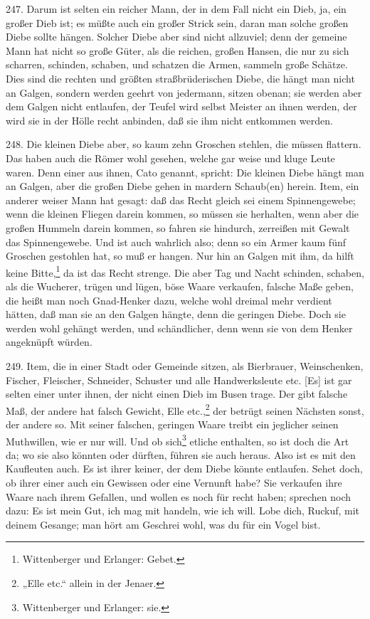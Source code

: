 247. Darum ist selten ein reicher Mann, der in dem Fall nicht ein Dieb, ja, ein großer Dieb ist; es müßte auch ein großer Strick sein, daran man solche großen Diebe sollte hängen. Solcher Diebe aber sind nicht allzuviel; denn der gemeine Mann hat nicht so große Güter, als die reichen, großen Hansen, die nur zu sich scharren, schinden, schaben, und schatzen die Armen, sammeln große Schätze. Dies sind die rechten und größten straßbrüderischen Diebe, die hängt man nicht an Galgen, sondern werden geehrt von jedermann, sitzen obenan; sie werden aber dem Galgen nicht entlaufen, der Teufel wird selbst Meister an ihnen werden, der wird sie in der Hölle recht anbinden, daß sie ihm nicht entkommen werden.

248. Die kleinen Diebe aber, so kaum zehn Groschen stehlen, die müssen flattern. Das haben auch die Römer wohl gesehen, welche gar weise und kluge Leute waren. Denn einer aus ihnen, Cato genannt, spricht: Die kleinen Diebe hängt man an Galgen, aber die großen Diebe gehen in mardern Schaub(en) herein. Item, ein anderer weiser Mann hat gesagt: daß das Recht gleich sei einem Spinnengewebe; wenn die kleinen Fliegen darein kommen, so müssen sie herhalten, wenn aber die großen Hummeln darein kommen, so fahren sie hindurch, zerreißen mit Gewalt das Spinnengewebe. Und ist auch wahrlich also; denn so ein Armer kaum fünf Groschen gestohlen hat, so muß er hangen. Nur hin an Galgen mit ihm, da hilft keine Bitte,\footnote{Wittenberger und Erlanger: Gebet.} da ist das Recht strenge. Die aber Tag und Nacht schinden, schaben, als die Wucherer, trügen und lügen, böse Waare verkaufen, falsche Maße geben, die heißt man noch Gnad-Henker dazu, welche wohl dreimal mehr verdient hätten, daß man sie an den Galgen hängte, denn die geringen Diebe. Doch sie werden wohl gehängt werden, und schändlicher, denn wenn sie von dem Henker angeknüpft würden.

249. Item, die in einer Stadt oder Gemeinde sitzen, als Bierbrauer, Weinschenken, Fischer, Fleischer, Schneider, Schuster und alle Handwerksleute etc. [Es] ist gar selten einer unter ihnen, der nicht einen Dieb im Busen trage. Der gibt falsche Maß, der andere hat falsch Gewicht, Elle etc.,\footnote{„Elle etc.“ allein in der Jenaer.} der betrügt seinen Nächsten sonst, der andere so. Mit seiner falschen, geringen Waare treibt ein jeglicher seinen Muthwillen, wie er nur will. Und ob sich\footnote{Wittenberger und Erlanger: sie.} etliche enthalten, so ist doch die Art da; wo sie also könnten oder dürften, führen sie auch heraus. Also ist es mit den Kaufleuten auch. Es ist ihrer keiner, der dem Diebe könnte entlaufen. Sehet doch, ob ihrer einer auch ein Gewissen oder eine Vernunft habe? Sie verkaufen ihre Waare nach ihrem Gefallen, und wollen es noch für recht haben; sprechen noch dazu: Es ist mein Gut, ich mag mit handeln, wie ich will. Lobe dich, Ruckuf, mit deinem Gesange; man hört am Geschrei wohl, was du für ein Vogel bist.

